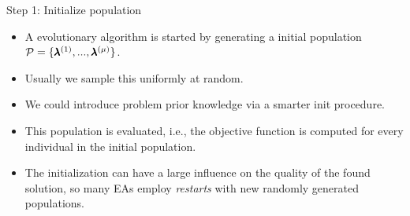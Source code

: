 \begin{frame}{Step 1: Initialize population}
    \begin{itemize}
            \item A evolutionary algorithm is started by generating a initial population $\mathcal{P} = \{\pmb{\lambda}^{(1)}, ..., \pmb{\lambda}^{(\mu)}\}$.
            \item Usually we sample this uniformly at random.
            \item We could introduce problem prior knowledge via a smarter init procedure.
            \item This population is evaluated, i.e., the objective function is computed for every individual in the initial population.
            \item The initialization can have a large influence on the quality of the found solution, so many EAs employ \textit{restarts} with new randomly generated populations.
    \end{itemize}

\end{frame}

